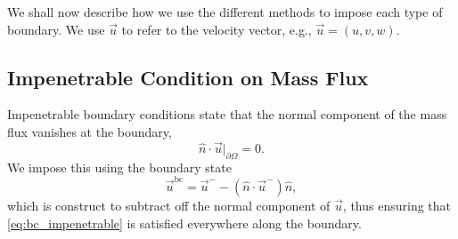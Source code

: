 \documentclass{report}
\numberwithin{equation}{section}
\begin{document}
We shall now describe how we use the different methods to impose each type of boundary. We use $\vec u$ to refer to the velocity vector, e.g., $\vec u = (u, v, w)$.

\subsection{Impenetrable Condition on Mass Flux}

Impenetrable boundary conditions state that the normal component of the mass flux vanishes at the boundary,
\begin{equation}
    \hat n \cdot \vec u \big|_{\partial \Omega} = 0.
    \label{eq:bc_impenetrable}
\end{equation}
We impose this using the boundary state 
\begin{equation}
    \vec u^{\text{bc}} = \vec u^- - \left(\hat n \cdot \vec u^-\right) \hat n,
\end{equation}
which is construct to subtract off the normal component of $\vec u$, thus ensuring that \eqref{eq:bc_impenetrable} is satisfied everywhere along the boundary. 
\end{document}

